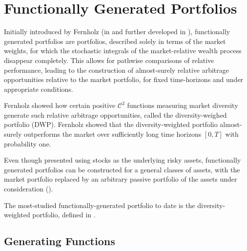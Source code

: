 \documentclass[british]{amsart}
\numberwithin{equation}{section}
\numberwithin{figure}{section}
\theoremstyle{plain}
\theoremstyle{definition}
\theoremstyle{plain}
\theoremstyle{plain}
\theoremstyle{plain}
\theoremstyle{remark}
\theoremstyle{plain}
\begin{document}
\newpage

\section{Functionally Generated Portfolios}

\newcommand{\CTwoFunction}{\mathcal{C}^2}

Initially introduced by Fernholz (in \cite{fernholz1999pgf} and further developed in \cite{fernholz2002}), functionally generated portfolios are portfolios, described solely in terms of the market weights, for which the stochastic integrals of the market-relative wealth process disappear completely. This allows for pathwise comparisons of relative performance, leading to the construction of almost-surely relative arbitrage opportunities relative to the market portfolio, for fixed time-horizons and under appropriate conditions.


Fernholz \cite{fernholz1999diversity} showed how certain positive $\CTwoFunction$ functions measuring market diversity generate such relative arbitrage opportunities, called the diversity-weighed portfolio (DWP). Fernholz \cite{fernholz2005} showed that the diversity-weighted portfolio almost-surely outperforms the market over sufficiently long time horizons $[0, T]$ with probability one. 

 


Even though presented using stocks as the underlying risky assets, functionally generated portfolios can be constructed for a general classes of assets, with the market portfolio replaced by an arbitrary passive portfolio of the assets under consideration (\cite{fernholz2009}).

The most-studied functionally-generated portfolio to date is the diversity-weighted portfolio, defined in \cite{fernholz2005}. 


\newpage

\subsection{Generating Functions}
\end{document}
